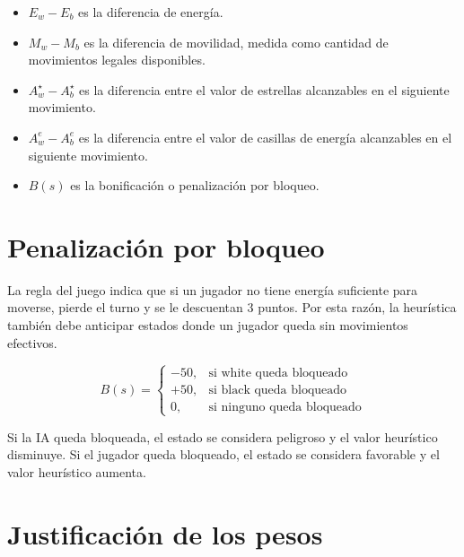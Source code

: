 \documentclass[12pt,letterpaper]{article}
\begin{document}
\begin{itemize}
    \item $E_w - E_b$ es la diferencia de energía.
    \item $M_w - M_b$ es la diferencia de movilidad, medida como cantidad de movimientos legales disponibles.
    \item $A^\star_w - A^\star_b$ es la diferencia entre el valor de estrellas alcanzables en el siguiente movimiento.
    \item $A^e_w - A^e_b$ es la diferencia entre el valor de casillas de energía alcanzables en el siguiente movimiento.
    \item $B(s)$ es la bonificación o penalización por bloqueo.
\end{itemize}

\section{Penalización por bloqueo}

La regla del juego indica que si un jugador no tiene energía suficiente para moverse, pierde el turno y se le descuentan 3 puntos. Por esta razón, la heurística también debe anticipar estados donde un jugador queda sin movimientos efectivos.

\[
B(s)=
\begin{cases}
-50, & \text{si white queda bloqueado}\\
+50, & \text{si black queda bloqueado}\\
0, & \text{si ninguno queda bloqueado}
\end{cases}
\]

\begin{tcolorbox}[colframe=KERed,title=\textbf{Importancia estratégica},coltitle=white,colbacktitle=KERed]
Si la IA queda bloqueada, el estado se considera peligroso y el valor heurístico disminuye. Si el jugador queda bloqueado, el estado se considera favorable y el valor heurístico aumenta.
\end{tcolorbox}

\section{Justificación de los pesos}
\end{document}
